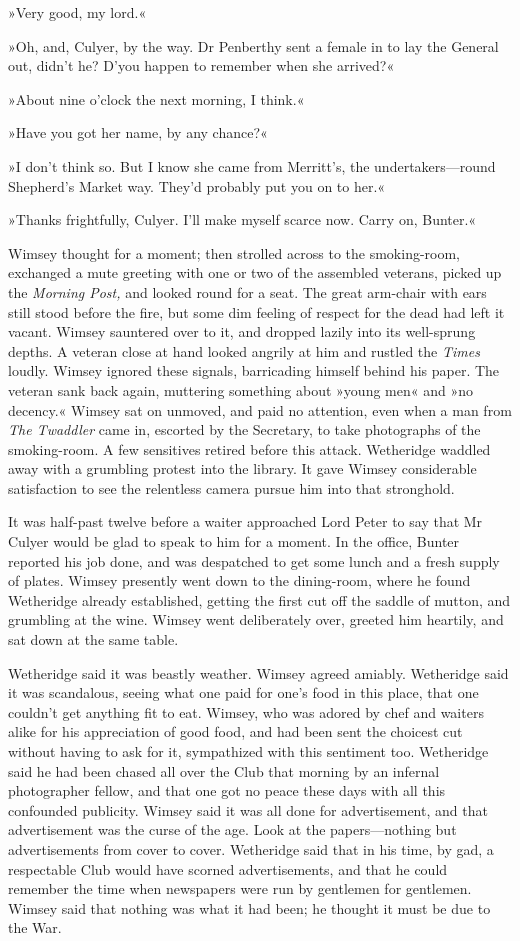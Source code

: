 »Very good, my lord.«

»Oh, and, Culyer, by the way. Dr Penberthy sent a female in to lay the General out, didn't he? D'you happen to remember when she arrived?«

»About nine o'clock the next morning, I think.«

»Have you got her name, by any chance?«

»I don't think so. But I know she came from Merritt's, the undertakers—round Shepherd's Market way. They'd probably put you on to her.«

»Thanks frightfully, Culyer. I'll make myself scarce now. Carry on, Bunter.«

Wimsey thought for a moment; then strolled across to the smoking-room, exchanged a mute greeting with one or two of the assembled veterans, picked up the \textit{Morning Post,} and looked round for a seat. The great arm-chair with ears still stood before the fire, but some dim feeling of respect for the dead had left it vacant. Wimsey sauntered over to it, and dropped lazily into its well-sprung depths. A veteran close at hand looked angrily at him and rustled the \textit{Times} loudly. Wimsey ignored these signals, barricading himself behind his paper. The veteran sank back again, muttering something about »young men« and »no decency.« Wimsey sat on unmoved, and paid no attention, even when a man from \textit{The Twaddler} came in, escorted by the Secretary, to take photographs of the smoking-room. A few sensitives retired before this attack. Wetheridge waddled away with a grumbling protest into the library. It gave Wimsey considerable satisfaction to see the relentless camera pursue him into that stronghold.

It was half-past twelve before a waiter approached Lord Peter to say that Mr Culyer would be glad to speak to him for a moment. In the office, Bunter reported his job done, and was despatched to get some lunch and a fresh supply of plates. Wimsey presently went down to the dining-room, where he found Wetheridge already established, getting the first cut off the saddle of mutton, and grumbling at the wine. Wimsey went deliberately over, greeted him heartily, and sat down at the same table.

Wetheridge said it was beastly weather. Wimsey agreed amiably. Wetheridge said it was scandalous, seeing what one paid for one's food in this place, that one couldn't get anything fit to eat. Wimsey, who was adored by chef and waiters alike for his appreciation of good food, and had been sent the choicest cut without having to ask for it, sympathized with this sentiment too. Wetheridge said he had been chased all over the Club that morning by an infernal photographer fellow, and that one got no peace these days with all this confounded publicity. Wimsey said it was all done for advertisement, and that advertisement was the curse of the age. Look at the papers—nothing but advertisements from cover to cover. Wetheridge said that in his time, by gad, a respectable Club would have scorned advertisements, and that he could remember the time when newspapers were run by gentlemen for gentlemen. Wimsey said that nothing was what it had been; he thought it must be due to the War.

